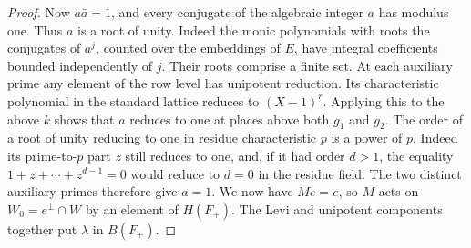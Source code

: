 \documentclass[a4paper,11pt]{article}
\theoremstyle{definition}
\theoremstyle{remark}
\numberwithin{equation}{section}
\begin{document}
\begin{proof}
Now \(a\bar a=1\), and every conjugate of the algebraic integer
\(a\) has modulus one. Thus \(a\) is a root of unity. Indeed the
monic polynomials with roots the conjugates of \(a^j\), counted
over the embeddings of \(E\), have integral coefficients bounded
independently of \(j\). Their roots comprise a finite set.
At each auxiliary prime any element of the row level has
unipotent reduction. Its characteristic polynomial in the
standard lattice reduces to \((X-1)^r\). Applying this to the
above \(k\) shows that \(a\) reduces to one at places above both
\(g_1\) and \(g_2\). The order of a root of unity reducing to one
in residue characteristic \(p\) is a power of \(p\). Indeed its
prime-to-\(p\) part \(z\) still reduces to one, and, if it had
order \(d>1\), the equality \(1+z+\cdots+z^{d-1}=0\) would reduce
to \(d=0\) in the residue field. The two distinct auxiliary primes
therefore give \(a=1\). We now have \(Me=e\), so \(M\) acts on
\(W_0=e^\perp\cap W\) by an element of \(H(F_+)\). The Levi and
unipotent components together put \(\lambda\) in \(B(F_+)\).
\end{proof}
\end{document}
